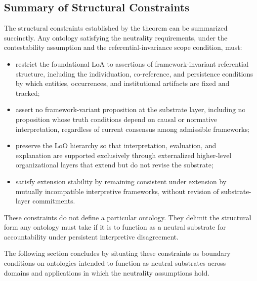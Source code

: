 \subsection{Summary of Structural Constraints}
\label{sec:summary-constraints}

The structural constraints established by the theorem can be summarized succinctly.
Any ontology satisfying the neutrality requirements,
under the contestability assumption and the referential-invariance
scope condition, must:

\begin{itemize}
  \item restrict the foundational LoA to assertions of
        framework-invariant referential structure,
        including the individuation, co-reference, and persistence
        conditions by which entities, occurrences, and institutional
        artifacts are fixed and tracked;
  \item assert no framework-variant proposition at the substrate layer,
        including no proposition whose truth conditions
        depend on causal or normative interpretation,
        regardless of current consensus among admissible frameworks;
  \item preserve the LoO hierarchy so that interpretation,
        evaluation, and explanation are supported exclusively
        through externalized higher-level organizational layers
        that extend but do not revise the substrate;
  \item satisfy extension stability by remaining consistent
        under extension by mutually incompatible interpretive frameworks,
        without revision of substrate-layer commitments.
\end{itemize}

These constraints do not define a particular ontology.
They delimit the structural form any ontology must take
if it is to function as a neutral substrate
for accountability under persistent interpretive disagreement.

The following section concludes by
situating these constraints as boundary conditions
on ontologies intended to function as
neutral substrates across domains and applications
in which the neutrality assumptions hold.
